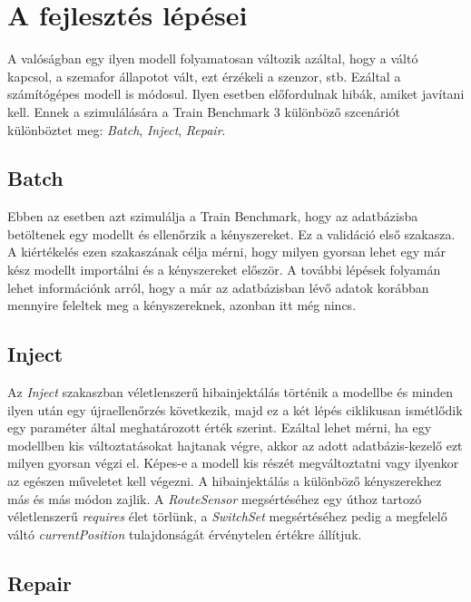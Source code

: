 
\section{A fejlesztés lépései}

A valóságban egy ilyen modell folyamatosan változik azáltal, hogy a váltó kapcsol, a szemafor állapotot vált, ezt érzékeli a szenzor, stb. Ezáltal a számítógépes modell is módosul. Ilyen esetben előfordulnak hibák, amiket javítani kell. Ennek a szimulálására a Train Benchmark 3 különböző szcenáriót különböztet meg: \emph{Batch}, \emph{Inject}, \emph{Repair}.

\subsection{Batch}

Ebben az esetben azt szimulálja a Train Benchmark, hogy az adatbázisba betöltenek egy modellt és ellenőrzik a kényszereket. Ez a validáció első szakasza. A kiértékelés ezen szakaszának célja mérni, hogy milyen gyorsan lehet egy már kész modellt importálni és a kényszereket először. A további lépések folyamán lehet információnk arról, hogy a már az adatbázisban lévő adatok korábban mennyire feleltek meg a kényszereknek, azonban itt még nincs.

\subsection{Inject}

Az \emph{Inject} szakaszban véletlenszerű hibainjektálás történik a modellbe és minden ilyen után egy újraellenőrzés következik, majd ez a két lépés ciklikusan ismétlődik egy paraméter által meghatározott érték szerint. Ezáltal lehet mérni, ha egy modellben kis változtatásokat hajtanak végre, akkor az adott adatbázis-kezelő ezt milyen gyorsan végzi el. Képes-e a modell kis részét megváltoztatni vagy ilyenkor az egészen műveletet kell végezni. A hibainjektálás a különböző kényszerekhez más és más módon zajlik. A \emph{RouteSensor} megsértéséhez egy úthoz tartozó véletlenszerű \emph{requires} élet törlünk, a \emph{SwitchSet} megsértéséhez pedig a megfelelő váltó \emph{currentPosition} tulajdonságát érvénytelen értékre állítjuk.

\subsection{Repair}

